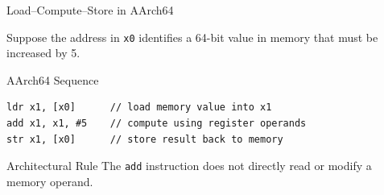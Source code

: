 \documentclass[aspectratio=169,11pt,t]{beamer}
\newcommand{\code}[1]{\texttt{#1}}
\begin{document}
\begin{frame}[fragile]{Load--Compute--Store in AArch64}

Suppose the address in \code{x0} identifies a 64-bit value in memory
that must be increased by 5.

\vspace{0.25cm}

\begin{block}{AArch64 Sequence}
\begin{verbatim}
ldr x1, [x0]      // load memory value into x1
add x1, x1, #5    // compute using register operands
str x1, [x0]      // store result back to memory
\end{verbatim}
\end{block}

\vspace{0.2cm}

\begin{block}{Architectural Rule}
The \code{add} instruction does not directly read or modify a memory operand.
\end{block}

\end{frame}


\end{document}
